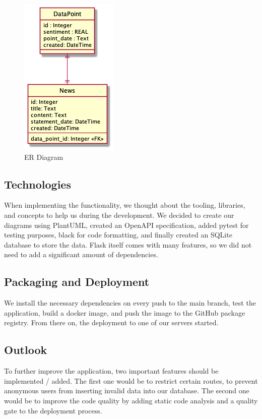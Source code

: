 \documentclass[
    fontsize=12pt,
    headings=small,
    parskip=half,           %
    bibliography=totoc,
    numbers=noenddot,       %
    open=any,               %
    ]{scrreprt}
\begin{document}
\begin{figure}[h]
    \centering
    \includegraphics[]{ER-Diagram.png}
    \caption{ER Diagram}
\end{figure}

\subsection{Technologies}
When implementing the functionality, we thought about the tooling, libraries, and concepts to help us during the development. We decided to create our diagrams using PlantUML, created an OpenAPI specification, added pytest for testing purposes, black for code formatting, and finally created an SQLite database to store the data. Flask itself comes with many features, so we did not need to add a significant amount of dependencies.

\subsection{Packaging and Deployment}
We install the necessary dependencies on every push to the main branch, test the application, build a docker image, and push the image to the GitHub package registry. From there on, the deployment to one of our servers started.

\subsection{Outlook}
To further improve the application, two important features should be implemented / added. 
The first one would be to restrict certain routes, to prevent anonymous users from inserting invalid data into our database.
The second one would be to improve the code quality by adding static code analysis and a quality gate to the deployment process.
\end{document}

